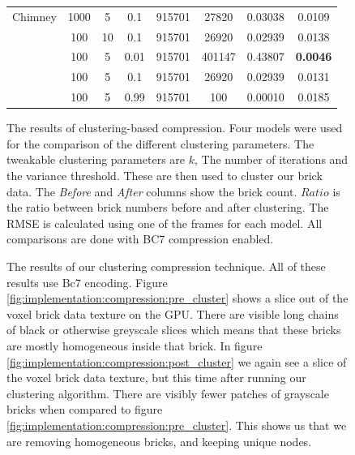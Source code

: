 \begin{figure}[H]
{\begin{tabular}{|l|ccc|cccc|}
            \hline
            \midrule
            Chimney      & 1000 & 5          & 0.1                & 915701  & 27820   & 0.03038           & 0.0109          \\
                         & 100  & 10         & 0.1                & 915701  & 26920   & 0.02939           & 0.0138          \\
                         & 100  & 5          & 0.01               & 915701  & 401147  & 0.43807           & \textbf{0.0046} \\
                         & 100  & 5          & 0.1                & 915701  & 26920   & 0.02939           & 0.0131          \\
                         & 100  & 5          & 0.99               & 915701  & 100     & 0.00010           & 0.0185          \\
            \hline
            \bottomrule
        \end{tabular}
        \label{tab:block_compression_visualized:table}
    }

    \caption{The results of clustering-based compression. Four models were used for the comparison of the different clustering parameters. The tweakable clustering parameters are $k$, The number of iterations and the variance threshold. These are then used to cluster our brick data. The \textit{Before} and \textit{After} columns show the brick count. $Ratio$ is the ratio between brick numbers before and after clustering. The RMSE is calculated using one of the frames for each model. All comparisons are done with BC7 compression enabled.} \label{fig:block_compression_visualized}
\end{figure}

\begin{figure}[H]
    \centering
    \hfill
    \caption{The results of our clustering compression technique. All of these results use Bc7 encoding. Figure \ref{fig:implementation:compression:pre_cluster} shows a slice out of the voxel brick data texture on the GPU. There are visible long chains of black or otherwise greyscale slices which means that these bricks are mostly homogeneous inside that brick. In figure \ref{fig:implementation:compression:post_cluster} we again see a slice of the voxel brick data texture, but this time after running our clustering algorithm. There are visibly fewer patches of grayscale bricks when compared to figure \ref{fig:implementation:compression:pre_cluster}. This shows us that we are removing homogeneous bricks, and keeping unique nodes.} \label{fig:implementation:compression:cluster}
\end{figure}



